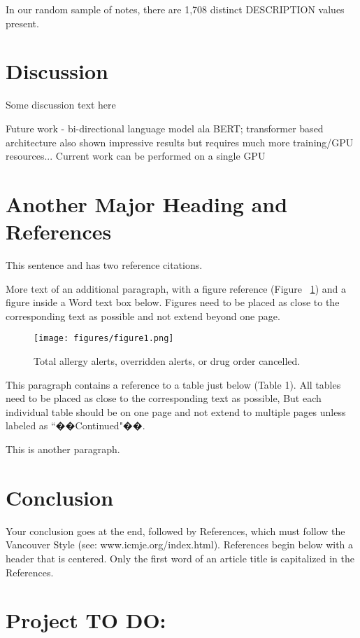 \documentclass{amia}
\begin{document}
In our random sample of notes, there are 1,708 distinct DESCRIPTION values present.

\section*{Discussion}

Some discussion text here

Future work - bi-directional language model ala BERT; transformer based architecture also shown impressive results but requires much more training/GPU resources...
Current work can be performed on a single GPU

\section*{Another Major Heading and References}
This sentence and has two reference citations\cite{ref1,ref2}.

More text of an additional paragraph, with a figure reference (Figure ~\ref{fig1}) and a figure inside a Word text box
below.  Figures need to be placed as close to the corresponding text as possible and not extend beyond one page.\\
\begin{figure}[h!]
\centering
\texttt{[image: figures/figure1.png]}
\caption{Total allergy alerts, overridden alerts, or drug order cancelled.}
\label{fig1}
\end{figure}

This paragraph contains a reference to a table just below (Table 1).  All tables need to be placed as close to the 
corresponding text as possible, But each individual table should be on one page and not extend to multiple pages
 unless labeled as ``��Continued"��.

This is another paragraph.

\section*{Conclusion}
Your conclusion goes at the end, followed by References, which must follow the Vancouver Style (see: www.icmje.org/index.html).  References begin below with a header that is centered.  Only the first word of an article title is capitalized in the References. 

\section*{Project TO DO:}
\end{document}
